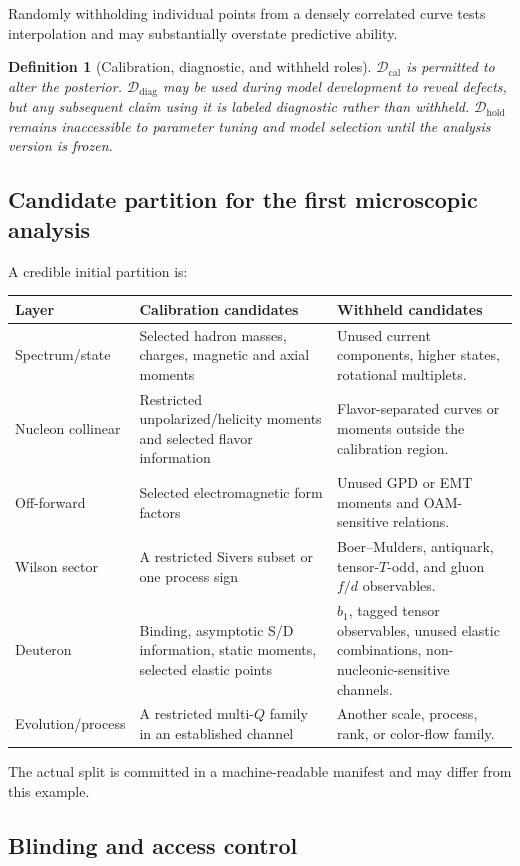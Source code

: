 \documentclass[11pt]{article}
\newtheorem{definition}{Definition}[section]
\newcommand{\caldata}{\mathcal D_{\mathrm{cal}}}
\newcommand{\diagdata}{\mathcal D_{\mathrm{diag}}}
\newcommand{\holddata}{\mathcal D_{\mathrm{hold}}}
\begin{document}
Randomly withholding individual points from a densely correlated curve tests
interpolation and may substantially overstate predictive ability.

\begin{definition}[Calibration, diagnostic, and withheld roles]
\(\caldata\) is permitted to alter the posterior.  \(\diagdata\) may be used
during model development to reveal defects, but any subsequent claim using it
is labeled diagnostic rather than withheld.  \(\holddata\) remains inaccessible
to parameter tuning and model selection until the analysis version is frozen.
\end{definition}

\subsection{Candidate partition for the first microscopic analysis}

A credible initial partition is:
\begin{longtable}{L{0.21\textwidth}L{0.34\textwidth}L{0.35\textwidth}}
\toprule
Layer & Calibration candidates & Withheld candidates\\
\midrule
\endhead
Spectrum/state & Selected hadron masses, charges, magnetic and axial moments &
Unused current components, higher states, rotational multiplets.\\
Nucleon collinear & Restricted unpolarized/helicity moments and selected
flavor information & Flavor-separated curves or moments outside the
calibration region.\\
Off-forward & Selected electromagnetic form factors & Unused GPD or EMT
moments and OAM-sensitive relations.\\
Wilson sector & A restricted Sivers subset or one process sign & Boer--Mulders,
antiquark, tensor-\(T\)-odd, and gluon \(f/d\) observables.\\
Deuteron & Binding, asymptotic S/D information, static moments, selected
elastic points & \(b_1\), tagged tensor observables, unused elastic
combinations, non-nucleonic-sensitive channels.\\
Evolution/process & A restricted multi-\(Q\) family in an established channel &
Another scale, process, rank, or color-flow family.\\
\bottomrule
\end{longtable}
The actual split is committed in a machine-readable manifest and may differ
from this example.

\subsection{Blinding and access control}
\end{document}
